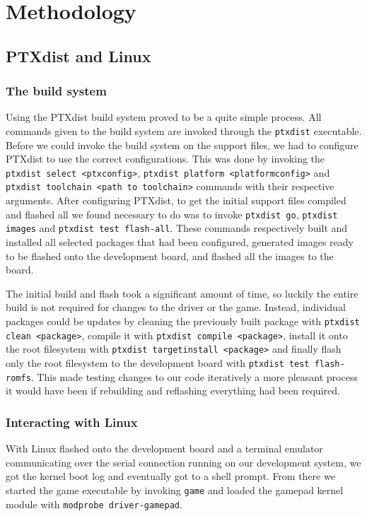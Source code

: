 \chapter{Methodology}

\section{PTXdist and Linux}

\subsection{The build system}

Using the PTXdist build system proved to be a quite simple process. All commands
given to the build system are invoked through the \texttt{ptxdist} executable.
Before we could invoke the build system on the support files, we had to
configure PTXdist to use the correct configurations. This was done by invoking
the \texttt{ptxdist select <ptxconfig>}, \texttt{ptxdist platform
<platformconfig>} and \texttt{ptxdist toolchain <path to toolchain>} commands
with their respective arguments. After configuring PTXdist, to get the initial
support files compiled and flashed all we found necessary to do was to invoke
\texttt{ptxdist go}, \texttt{ptxdist images} and \texttt{ptxdist test
flash-all}. These commands respectively built and installed all selected
packages that had been configured, generated images ready to be flashed onto the
development board, and flashed all the images to the board.

The initial build and flash took a significant amount of time, so luckily the
entire build is not required for changes to the driver or the game. Instead,
individual packages could be updates by cleaning the previously built package
with \texttt{ptxdist clean <package>}, compile it with \texttt{ptxdist compile
<package>}, install it onto the root filesystem with \texttt{ptxdist
targetinstall <package>} and finally flash only the root filesystem to the
development board with \texttt{ptxdist test flash-romfs}. This made testing
changes to our code iteratively a more pleasant process it would have been if
rebuilding and reflashing everything had been required.

\subsection{Interacting with Linux}

With Linux flashed onto the development board and a terminal emulator
communicating over the serial connection running on our development system, we
got the kernel boot log and eventually got to a shell prompt. From there we
started the game executable by invoking \texttt{game} and loaded the gamepad
kernel module with \texttt{modprobe driver-gamepad}.

